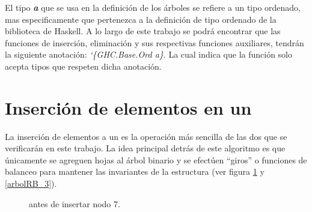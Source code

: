 El tipo \textit{\textbf{a}} que se usa en la definici\'on de los \'arboles se refiere a 
un tipo ordenado, mas especificamente que pertenezca a la definici\'on de tipo ordenado 
de la biblioteca de Haskell\cite{orderings}. A lo largo de este trabajo se podr\'a 
encontrar que las funciones de inserci\'on, eliminaci\'on y sus respectivas funciones 
auxiliares, tendr\'an la siguiente anotaci\'on: \textit{`\{GHC.Base.Ord a\}}. La cual 
indica que la funci\'on solo acepta tipos que respeten dicha anotaci\'on.

\section{Inserción de elementos en un {\arn}}

La inserci\'on de elementos a un {\arn} es la operaci\'on m\'as sencilla de las dos que se
verificar\'an en este trabajo. La idea principal detrás de este algoritmo es que \'unicamente se 
agreguen hojas al \'arbol binario y se efectúen ``giros'' o funciones de balanceo para 
mantener las invariantes de la estructura (ver figura \ref{arbolRB_2} y \ref{arbolRB_3}).

\begin{figure}[!ht]
\centering
\captionsetup{justification=centering}
\caption{{\Arn} antes de insertar nodo 7.}
\label{arbolRB_2}
\end{figure}

